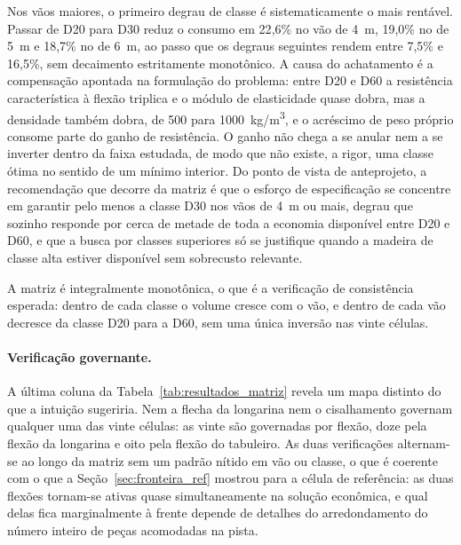 Nos vãos maiores, o primeiro degrau de classe é sistematicamente o mais rentável.
Passar de D20 para D30 reduz o consumo em 22{,}6\% no vão de 4~m, 19{,}0\% no de 5~m e 18{,}7\% no de 6~m, ao passo que os degraus seguintes rendem entre 7{,}5\% e 16{,}5\%, sem decaimento estritamente monotônico.
A causa do achatamento é a compensação apontada na formulação do problema: entre D20 e D60 a resistência característica à flexão triplica e o módulo de elasticidade quase dobra, mas a densidade também dobra, de 500 para 1000~kg/m\textsuperscript{3}, e o acréscimo de peso próprio consome parte do ganho de resistência.
O ganho não chega a se anular nem a se inverter dentro da faixa estudada, de modo que não existe, a rigor, uma classe ótima no sentido de um mínimo interior.
Do ponto de vista de anteprojeto, a recomendação que decorre da matriz é que o esforço de especificação se concentre em garantir pelo menos a classe D30 nos vãos de 4~m ou mais, degrau que sozinho responde por cerca de metade de toda a economia disponível entre D20 e D60, e que a busca por classes superiores só se justifique quando a madeira de classe alta estiver disponível sem sobrecusto relevante.

A matriz é integralmente monotônica, o que é a verificação de consistência esperada: dentro de cada classe o volume cresce com o vão, e dentro de cada vão decresce da classe D20 para a D60, sem uma única inversão nas vinte células.

\paragraph{Verificação governante.} A última coluna da Tabela~\ref{tab:resultados_matriz} revela um mapa distinto do que a intuição sugeriria.
Nem a flecha da longarina nem o cisalhamento governam qualquer uma das vinte células: as vinte são governadas por flexão, doze pela flexão da longarina e oito pela flexão do tabuleiro.
As duas verificações alternam-se ao longo da matriz sem um padrão nítido em vão ou classe, o que é coerente com o que a Seção~\ref{sec:fronteira_ref} mostrou para a célula de referência: as duas flexões tornam-se ativas quase simultaneamente na solução econômica, e qual delas fica marginalmente à frente depende de detalhes do arredondamento do número inteiro de peças acomodadas na pista.

